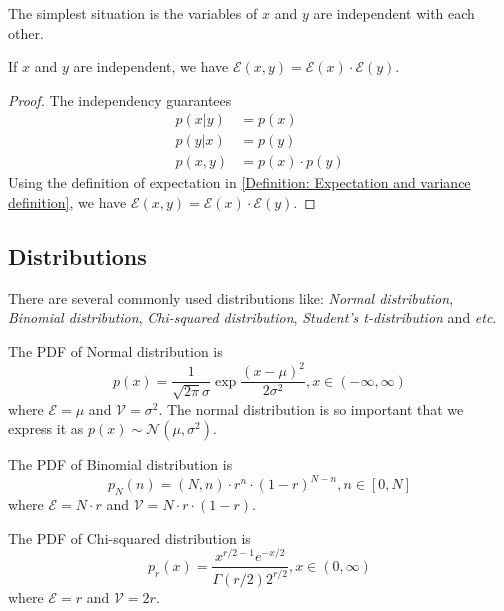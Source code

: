 \documentclass[../main.tex]{subfiles}
\begin{document}
The simplest situation is the variables of $x$ and $y$ are independent with each other.
\begin{lemma}
    \label{Lemma: Confusing second-order moment of independent variables}
    If $x$ and $y$ are independent, we have $\mathcal{E}(x, y) = \mathcal{E}(x) \cdot \mathcal{E}(y)$.
    \begin{proof}
        The independency guarantees
        \begin{align*}
            p(x|y)  & = p(x)            \\
            p(y|x)  & = p(y)            \\
            p(x, y) & = p(x) \cdot p(y)
        \end{align*}
        Using the definition of expectation in \eqref{Definition: Expectation and variance definition},
        we have $\mathcal{E}(x, y) = \mathcal{E}(x) \cdot \mathcal{E}(y)$.
    \end{proof}
\end{lemma}

\subsection{Distributions}
There are several commonly used distributions like: \emph{Normal distribution}, \emph{Binomial distribution}, \emph{Chi-squared distribution}, \emph{Student's t-distribution} and \textit{etc}.

\bigbreak
The PDF of Normal distribution is
\begin{equation}
    \label{Definition: PDF of Normal distribution}
    p(x)=
    \frac{1}{\sqrt{2\pi}\sigma} \exp{\frac{(x-\mu)^2}{2\sigma^2}},
    x \in (-\infty, \infty)
\end{equation}
where $\mathcal{E}=\mu$ and $\mathcal{V}=\sigma^2$.
The normal distribution is so important that we express it as $p(x) \sim \mathcal{N}(\mu, \sigma^2)$.

\bigbreak
The PDF of Binomial distribution is
\begin{equation}
    \label{Definition: PDF of Binomial distribution}
    p_N(n)=
    (N, n) \cdot r^n \cdot (1-r)^{N-n},
    n \in [0, N]
\end{equation}
where $\mathcal{E}=N \cdot r$ and $\mathcal{V}=N \cdot r \cdot (1-r)$.

\bigbreak
The PDF of Chi-squared distribution is
\begin{equation}
    \label{Definition: PDF of Chi-squared distribution}
    p_r(x)=
    \frac{x^{r/2-1} e^{-x/2}}{\Gamma(r/2) 2^{r/2}},
    x \in (0, \infty)
\end{equation}
where $\mathcal{E}=r$ and $\mathcal{V}=2r$.
\end{document}
